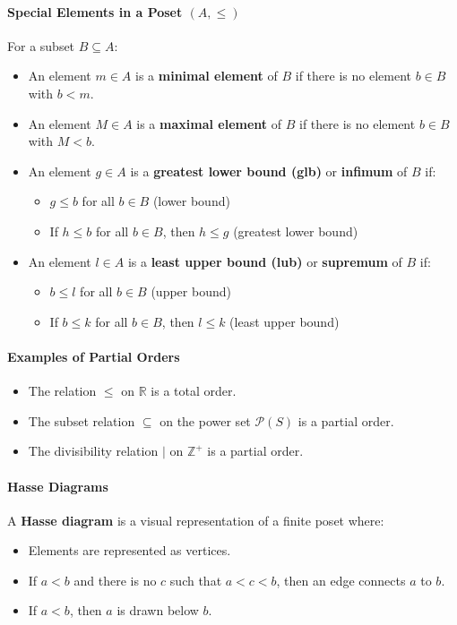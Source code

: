 \paragraph*{Special Elements in a Poset $(A, \leq)$}
For a subset $B \subseteq A$:
\begin{itemize}
    \item An element $m \in A$ is a \textbf{minimal element} of $B$ if there is no element $b \in B$ with $b < m$.
    \item An element $M \in A$ is a \textbf{maximal element} of $B$ if there is no element $b \in B$ with $M < b$.
    \item An element $g \in A$ is a \textbf{greatest lower bound (glb)} or \textbf{infimum} of $B$ if:
    \begin{itemize}
        \item $g \leq b$ for all $b \in B$ (lower bound)
        \item If $h \leq b$ for all $b \in B$, then $h \leq g$ (greatest lower bound)
    \end{itemize}
    \item An element $l \in A$ is a \textbf{least upper bound (lub)} or \textbf{supremum} of $B$ if:
    \begin{itemize}
        \item $b \leq l$ for all $b \in B$ (upper bound)
        \item If $b \leq k$ for all $b \in B$, then $l \leq k$ (least upper bound)
    \end{itemize}
\end{itemize}

\paragraph*{Examples of Partial Orders}
\begin{itemize}
    \item The relation $\leq$ on $\mathbb{R}$ is a total order.
    \item The subset relation $\subseteq$ on the power set $\mathcal{P}(S)$ is a partial order.
    \item The divisibility relation $|$ on $\mathbb{Z}^+$ is a partial order.
\end{itemize}

\paragraph*{Hasse Diagrams}
A \textbf{Hasse diagram} is a visual representation of a finite poset where:
\begin{itemize}
    \item Elements are represented as vertices.
    \item If $a < b$ and there is no $c$ such that $a < c < b$, then an edge connects $a$ to $b$.
    \item If $a < b$, then $a$ is drawn below $b$.
\end{itemize}


